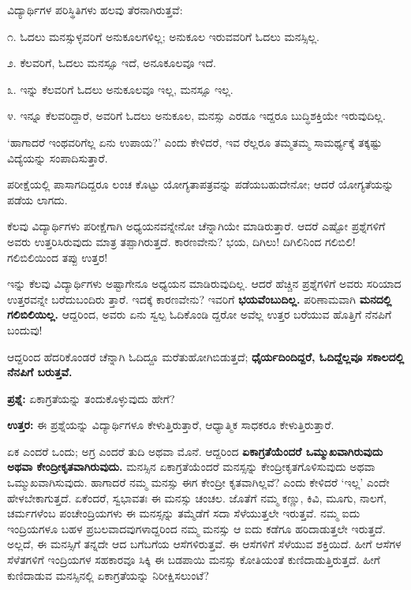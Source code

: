 ವಿದ್ಯಾರ್ಥಿಗಳ ಪರಿಸ್ಥಿತಿಗಳು ಹಲವು ತೆರನಾಗಿರುತ್ತವೆ:

೧. ಓದಲು ಮನಸ್ಸುಳ್ಳವರಿಗೆ ಅನುಕೂಲಗಳಿಲ್ಲ; ಅನುಕೂಲ ಇರುವವರಿಗೆ ಓದಲು ಮನಸ್ಸಿಲ್ಲ.

೨. ಕೆಲವರಿಗೆ, ಓದಲು ಮನಸ್ಸೂ ಇದೆ, ಅನೂಕೂಲವೂ ಇದೆ.

೩. ಇನ್ನು ಕೆಲವರಿಗೆ ಓದಲು ಅನುಕೂಲವೂ ಇಲ್ಲ, ಮನಸ್ಸೂ ಇಲ್ಲ.

೪. ಇನ್ನೂ ಕೆಲವರಿದ್ದಾರೆ, ಅವರಿಗೆ ಓದಲು ಅನುಕೂಲ, ಮನಸ್ಸು ಎರಡೂ ಇದ್ದರೂ ಬುದ್ಧಿಶಕ್ತಿಯೇ ಇರುವುದಿಲ್ಲ.

‘ಹಾಗಾದರೆ ಇಂಥವರಿಗೆಲ್ಲ ಏನು ಉಪಾಯ?’ ಎಂದು ಕೇಳಿದರೆ, ಇವ ರೆಲ್ಲರೂ ತಮ್ಮತಮ್ಮ ಸಾಮರ್ಥ್ಯಕ್ಕೆ ತಕ್ಕಷ್ಟು ವಿದ್ಯೆಯನ್ನು ಸಂಪಾದಿಸುತ್ತಾರೆ.

\delimiter

ಪರೀಕ್ಷೆಯಲ್ಲಿ ಪಾಸಾಗದಿದ್ದರೂ ಲಂಚ ಕೊಟ್ಟು ಯೋಗ್ಯತಾಪತ್ರವನ್ನು  ಪಡೆಯಬಹುದೇನೋ; ಆದರೆ ಯೋಗ್ಯತೆಯನ್ನು ಪಡೆಯ ಲಾಗದು.

\delimiter

ಕೆಲವು ವಿದ್ಯಾರ್ಥಿಗಳು ಪರೀಕ್ಷೆಗಾಗಿ ಅಧ್ಯಯನವನ್ನೇನೋ ಚೆನ್ನಾಗಿಯೇ ಮಾಡಿರುತ್ತಾರೆ. ಆದರೆ ಎಷ್ಟೋ ಪ್ರಶ್ನೆಗಳಿಗೆ ಅವರು ಉತ್ತರಿಸಿರುವುದು ಮಾತ್ರ ತಪ್ಪಾಗಿರುತ್ತದೆ. ಕಾರಣವೇನು? ಭಯ, ದಿಗಿಲು! ದಿಗಿಲಿನಿಂದ ಗಲಿಬಿಲಿ! ಗಲಿಬಿಲಿಯಿಂದ ತಪ್ಪು ಉತ್ತರ!

ಇನ್ನು ಕೆಲವು ವಿದ್ಯಾರ್ಥಿಗಳು ಅಷ್ಟಾಗೇನೂ ಅಧ್ಯಯನ ಮಾಡಿರುವುದಿಲ್ಲ. ಆದರೆ ಹೆಚ್ಚಿನ ಪ್ರಶ್ನೆಗಳಿಗೆ ಅವರು ಸರಿಯಾದ ಉತ್ತರವನ್ನೇ ಬರೆದುಬಂದಿರು ತ್ತಾರೆ. ಇದಕ್ಕೆ ಕಾರಣವೇನು? ಇವರಿಗೆ \textbf{ಭಯವೆಂಬುದಿಲ್ಲ.} ಪರಿಣಾಮವಾಗಿ \textbf{ಮನದಲ್ಲಿ ಗಲಿಬಿಲಿಯಿಲ್ಲ.} ಆದ್ದರಿಂದ, ಅವರು ಏನು ಸ್ವಲ್ಪ ಓದಿಕೊಂಡಿ ದ್ದರೋ ಅವೆಲ್ಲ ಉತ್ತರ ಬರೆಯುವ ಹೊತ್ತಿಗೆ ನೆನಪಿಗೆ ಬಂದುವು!

ಆದ್ದರಿಂದ ಹೆದರಿಕೊಂಡರೆ ಚೆನ್ನಾಗಿ ಓದಿದ್ದೂ ಮರೆತುಹೋಗಿಬಿಡುತ್ತದೆ; \textbf{ಧೈರ್ಯದಿಂದಿದ್ದರೆ, ಓದಿದ್ದೆಲ್ಲವೂ ಸಕಾಲದಲ್ಲಿ ನೆನಪಿಗೆ ಬರುತ್ತವೆ.}

\delimiter

\textbf{ಪ್ರಶ್ನೆ:} ಏಕಾಗ್ರತೆಯನ್ನು ತಂದುಕೊಳ್ಳುವುದು ಹೇಗೆ?

\textbf{ಉತ್ತರ:} ಈ ಪ್ರಶ್ನೆಯನ್ನು ವಿದ್ಯಾರ್ಥಿಗಳೂ ಕೇಳುತ್ತಿರುತ್ತಾರೆ, ಆಧ್ಯಾತ್ಮಿಕ ಸಾಧಕರೂ ಕೇಳುತ್ತಿರುತ್ತಾರೆ.

ಏಕ ಎಂದರೆ ಒಂದು; ಅಗ್ರ ಎಂದರೆ ತುದಿ ಅಥವಾ ಮೊನೆ. ಆದ್ದರಿಂದ \textbf{ಏಕಾಗ್ರತೆಯೆಂದರೆ ಒಮ್ಮುಖವಾಗಿರುವುದು ಅಥವಾ ಕೇಂದ್ರೀಕೃತವಾಗಿರುವುದು.} ಮನಸ್ಸಿನ ಏಕಾಗ್ರತೆಯೆಂದರೆ ಮನಸ್ಸನ್ನು ಕೇಂದ್ರೀಕೃತಗೊಳಿಸುವುದು ಅಥವಾ ಒಮ್ಮುಖವಾಗಿಸುವುದು. ಹಾಗಾದರೆ ನಮ್ಮ ಮನಸ್ಸು ಈಗ ಕೇಂದ್ರೀ ಕೃತವಾಗಿಲ್ಲವೆ? ಎಂದು ಕೇಳಿದರೆ ‘ಇಲ್ಲ’ ಎಂದೇ ಹೇಳಬೇಕಾಗುತ್ತದೆ. ಏಕೆಂದರೆ, ಸ್ವಭಾವತಃ ಈ ಮನಸ್ಸು ಚಂಚಲ. ಜೊತೆಗೆ ನಮ್ಮ ಕಣ್ಣು, ಕಿವಿ, ಮೂಗು, ನಾಲಗೆ, ಚರ್ಮಗಳೆಂಬ ಪಂಚೇಂದ್ರಿಯಗಳು ಈ ಮನಸ್ಸನ್ನು ತಮ್ಮೆಡೆಗೆ ಸದಾ ಸೆಳೆಯುತ್ತಲೇ ಇರುತ್ತವೆ. ನಮ್ಮ ಐದು ಇಂದ್ರಿಯಗಳೂ ಬಹಳ ಪ್ರಬಲವಾದವುಗಳಾದ್ದರಿಂದ ನಮ್ಮ ಮನಸ್ಸು ಆ ಐದು ಕಡೆಗೂ ಹರಿದಾಡುತ್ತಲೇ ಇರುತ್ತದೆ. ಅಲ್ಲದೆ, ಈ ಮನಸ್ಸಿಗೆ ತನ್ನದೇ ಆದ ಬಗೆಬಗೆಯ ಆಸೆಗಳಿರುತ್ತವೆ. ಈ ಆಸೆಗಳಿಗೆ ಸೆಳೆಯುವ ಶಕ್ತಿಯಿದೆ. ಹೀಗೆ ಆಸೆಗಳ ಸೆಳೆತಗಳಿಗೆ ಇಂದ್ರಿಯಗಳ ಸಹಕಾರವೂ ಸಿಕ್ಕಿ ಈ ಬಡಪಾಯಿ ಮನಸ್ಸು ಕೋತಿಯಂತೆ ಕುಣಿದಾಡುತ್ತಿರುತ್ತದೆ. ಹೀಗೆ ಕುಣಿದಾಡುವ ಮನಸ್ಸಿನಲ್ಲಿ ಏಕಾಗ್ರತೆಯನ್ನು ನಿರೀಕ್ಷಿಸಲುಂಟೆ?

